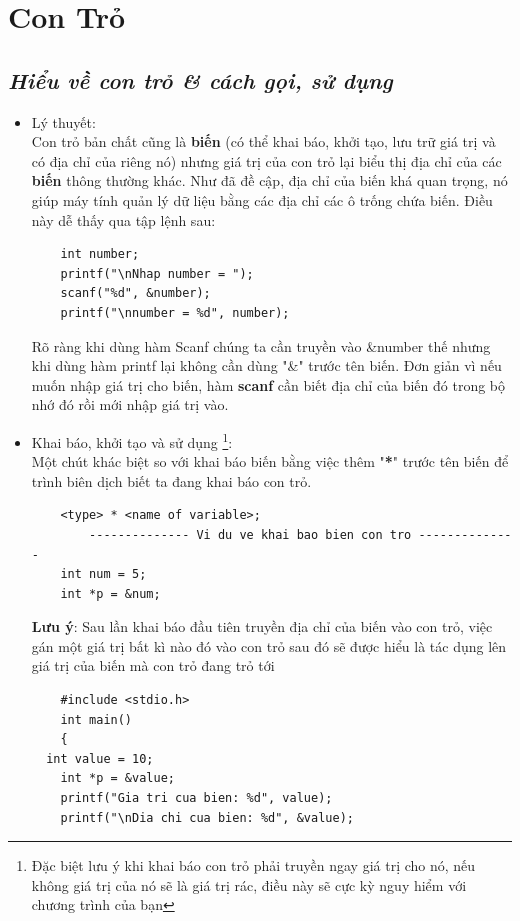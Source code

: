 \documentclass[12pt,a4paper]{article}
\begin{document}
\section{Con Trỏ}
\begin{center}
	\subsection*{\textbf{\textit{Hiểu về con trỏ \& cách gọi, sử dụng}}}
\end{center}
\begin{itemize}
	\item Lý thuyết:\\
Con trỏ bản chất cũng là \textbf{biến} (có thể khai báo, khởi tạo, lưu trữ giá trị và có địa chỉ của riêng nó) nhưng giá trị của con trỏ lại biểu thị địa chỉ của các \textbf{biến} thông thường khác. Như đã đề cập, địa chỉ của biến khá quan trọng, nó giúp máy tính quản lý dữ liệu bằng các địa chỉ các ô trống chứa biến. Điều này dễ thấy qua tập lệnh sau:
\begin{lstlisting}
	int number;
	printf("\nNhap number = ");
	scanf("%d", &number);
	printf("\nnumber = %d", number);
\end{lstlisting}
Rõ ràng khi dùng hàm Scanf chúng ta cần truyền vào &number thế nhưng khi dùng hàm printf lại không cần dùng "\&" trước tên biến. Đơn giản vì nếu muốn nhập giá trị cho biến, hàm \textbf{scanf} cần biết địa chỉ của biến đó trong bộ nhớ đó rồi mới nhập giá trị vào.
	\item Khai báo, khởi tạo và sử dụng \footnote{Đặc biệt lưu ý khi khai báo con trỏ phải truyền ngay giá trị cho nó, nếu không giá trị của nó sẽ là giá trị rác, điều này sẽ cực kỳ nguy hiểm với chương trình của bạn}:\\
Một chút khác biệt so với khai báo biến bằng việc  thêm "\textbf{*}" trước tên biến để trình biên dịch biết ta đang khai báo con trỏ.
\begin{lstlisting}
	<type> * <name of variable>;
		-------------- Vi du ve khai bao bien con tro --------------
	int num = 5;
	int *p = &num;
\end{lstlisting}
\textbf{Lưu ý}: Sau lần khai báo đầu tiên truyền địa chỉ của biến vào con trỏ, việc gán một giá trị bất kì nào đó vào con trỏ sau đó sẽ được hiểu là tác dụng lên giá trị của biến mà con trỏ đang trỏ tới
\begin{lstlisting}
	#include <stdio.h>
	int main()
	{ 
  int value = 10;
    int *p = &value;
    printf("Gia tri cua bien: %d", value);
    printf("\nDia chi cua bien: %d", &value);

\end{lstlisting}
\end{itemize}
\end{document}
